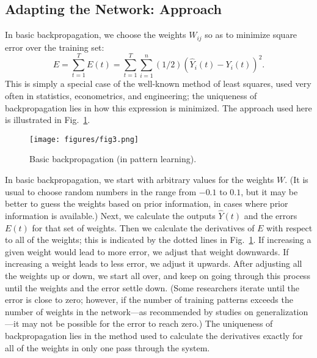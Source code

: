 \documentclass[journal]{IEEEtran} %
\begin{document}
\subsection{Adapting the Network: Approach}
In basic backpropagation, we choose the weights $W_{ij}$ so as to minimize square error over the training set:
\begin{equation}
    E = \sum_{t=1}^T E(t) = \sum_{t=1}^T \sum_{i=1}^n (1/2) (\hat{Y}_i(t) - Y_i(t))^2. \label{eq:error_sum}
\end{equation}
This is simply a special case of the well-known method of least squares, used very often in statistics, econometrics, and engineering; the uniqueness of backpropagation lies in how this expression is minimized. The approach used here is illustrated in Fig.~\ref{fig:basic_bp_pattern_learning}.

\begin{figure}[htb]
    \centering
    \texttt{[image: figures/fig3.png]} %
    \caption{Basic backpropagation (in pattern learning).}
    \label{fig:basic_bp_pattern_learning}
\end{figure}

In basic backpropagation, we start with arbitrary values for the weights $W$. (It is usual to choose random numbers in the range from $-0.1$ to $0.1$, but it may be better to guess the weights based on prior information, in cases where prior information is available.) Next, we calculate the outputs $\hat{Y}(t)$ and the errors $E(t)$ for that set of weights. Then we calculate the derivatives of $E$ with respect to all of the weights; this is indicated by the dotted lines in Fig.~\ref{fig:basic_bp_pattern_learning}. If increasing a given weight would lead to more error, we adjust that weight downwards. If increasing a weight leads to less error, we adjust it upwards. After adjusting all the weights up or down, we start all over, and keep on going through this process until the weights and the error settle down. (Some researchers iterate until the error is close to zero; however, if the number of training patterns exceeds the number of weights in the network---as recommended by studies on generalization---it may not be possible for the error to reach zero.) The uniqueness of backpropagation lies in the method used to calculate the derivatives exactly for all of the weights in only one pass through the system.
\end{document}
